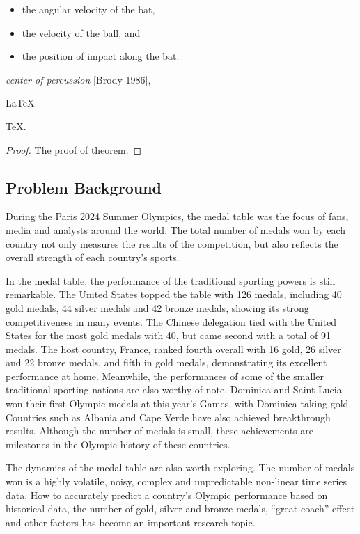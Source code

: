 \documentclass{mcmthesis}
\begin{document}
\lipsum[3]
\begin{itemize}
\item the angular velocity of the bat,
\item the velocity of the ball, and
\item the position of impact along the bat.
\end{itemize}
\lipsum[4]
\emph{center of percussion} [Brody 1986], \lipsum[5]
\begin{Theorem} \label{thm:latex}
\LaTeX
\end{Theorem}
\begin{Lemma} \label{thm:tex}
\TeX .
\end{Lemma}
\begin{proof}
The proof of theorem.
\end{proof}
\fi


\subsection{Problem Background}
During the Paris 2024 Summer Olympics, the medal table was the focus of fans, media and analysts around the world. The total number of medals won by each country not only measures the results of the competition, but also reflects the overall strength of each country's sports.

In the medal table, the performance of the traditional sporting powers is still remarkable. The United States topped the table with 126 medals, including 40 gold medals, 44 silver medals and 42 bronze medals, showing its strong competitiveness in many events. The Chinese delegation tied with the United States for the most gold medals with 40, but came second with a total of 91 medals. The host country, France, ranked fourth overall with 16 gold, 26 silver and 22 bronze medals, and fifth in gold medals, demonstrating its excellent performance at home.
Meanwhile, the performances of some of the smaller traditional sporting nations are also worthy of note. Dominica and Saint Lucia won their first Olympic medals at this year's Games, with Dominica taking gold. Countries such as Albania and Cape Verde have also achieved breakthrough results. Although the number of medals is small, these achievements are milestones in the Olympic history of these countries.

The dynamics of the medal table are also worth exploring. The number of medals won is a highly volatile, noisy, complex and unpredictable non-linear time series data. How to accurately predict a country's Olympic performance based on historical data, the number of gold, silver and bronze medals, “great coach” effect and other factors has become an important research topic.
\end{document}
